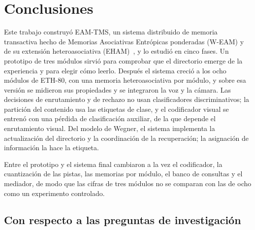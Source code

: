 \chapter{Conclusiones}\label{conclusiones}
\label{sec:conclusiones}
Este trabajo construyó EAM-TMS, un sistema distribuido de memoria transactiva hecho de
Memorias Asociativas Entrópicas ponderadas (W-EAM) y de su extensión heteroasociativa
(EHAM)~\cite{pineda2021entropic,pineda2022weighted,morales2025missing}, y lo estudió en
cinco fases.
Un prototipo de tres módulos sirvió para comprobar que el directorio emerge de la experiencia y
para elegir cómo leerlo.
Después el sistema creció a los ocho módulos de ETH-80, con una memoria heteroasociativa
por módulo, y sobre esa versión se midieron sus propiedades y se integraron la voz y la
cámara.
Las decisiones de enrutamiento y de rechazo no usan clasificadores discriminativos; la
partición del contenido usa las etiquetas de clase, y el codificador visual se entrenó
con una pérdida de clasificación auxiliar, de la que depende el enrutamiento visual.
Del modelo de Wegner, el sistema implementa la actualización del directorio y la
coordinación de la recuperación; la asignación de información la hace la etiqueta.

Entre el prototipo y el sistema final cambiaron a la vez el codificador, la cuantización
de las pistas, las memorias por módulo, el banco de consultas y el mediador, de modo que
las cifras de tres módulos no se comparan con las de ocho como un experimento controlado.

\section{Con respecto a las preguntas de investigación}

